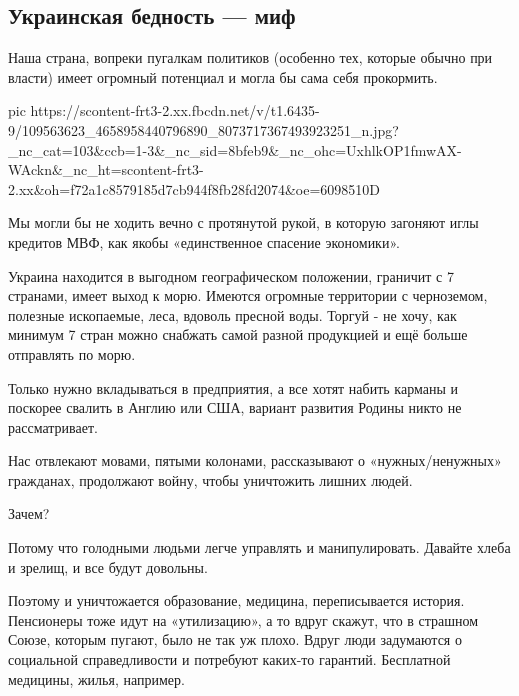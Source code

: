  
 
 
 
 


\subsection{Украинская бедность — миф}

Наша страна, вопреки пугалкам политиков (особенно тех, которые обычно при
власти) имеет огромный потенциал и могла бы сама себя прокормить. 


\ifcmt
  pic https://scontent-frt3-2.xx.fbcdn.net/v/t1.6435-9/109563623_4658958440796890_8073717367493923251_n.jpg?_nc_cat=103&ccb=1-3&_nc_sid=8bfeb9&_nc_ohc=UxhlkOP1fmwAX-WAckn&_nc_ht=scontent-frt3-2.xx&oh=f72a1c8579185d7cb944f8fb28fd2074&oe=6098510D
\fi

Мы могли бы не ходить вечно с протянутой рукой, в которую загоняют иглы
кредитов МВФ, как якобы «единственное спасение экономики». 

Украина находится в выгодном географическом положении, граничит с 7 странами,
имеет выход к морю. Имеются огромные территории с черноземом, полезные
ископаемые, леса, вдоволь пресной воды. Торгуй - не хочу, как минимум 7 стран
можно снабжать самой разной продукцией и ещё больше отправлять по морю. 

Только нужно вкладываться в предприятия, а все хотят набить карманы и поскорее
свалить в Англию или США, вариант развития Родины никто не рассматривает.

Нас отвлекают мовами, пятыми колонами, рассказывают о «нужных/ненужных»
гражданах, продолжают войну, чтобы уничтожить лишних людей. 

Зачем? 

Потому что голодными людьми легче управлять и манипулировать. Давайте хлеба и
зрелищ, и все будут довольны.

Поэтому и уничтожается образование, медицина, переписывается история.
Пенсионеры тоже идут на «утилизацию», а то вдруг скажут, что в страшном Союзе,
которым пугают, было не так уж плохо. Вдруг люди задумаются о социальной
справедливости и потребуют каких-то гарантий. Бесплатной медицины, жилья,
например. 

